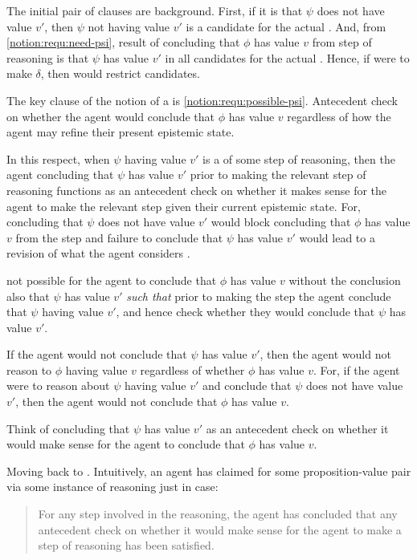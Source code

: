 \begin{note}
  The initial pair of clauses are background.
  First, if it is \epVAd{} that \(\psi\) does not have value \(v'\), then \(\psi\) not having value \(v'\) is a candidate for the actual \world{}.
  And, from \ref{notion:requ:need-psi}, result of concluding that \(\phi\) has value \(v\) from step of reasoning is that \(\psi\) has value \(v'\) in all candidates for the actual \world{}.
  Hence, if were to make \(\delta\), then would restrict candidates.

  The key clause of the notion of a \requ{} is \ref{notion:requ:possible-psi}.
  Antecedent check on whether the agent would conclude that \(\phi\) has value \(v\) regardless of how the agent may refine their present epistemic state.

  

  In this respect, when \(\psi\) having value \(v'\) is a \requ{} of some step of reasoning, then the agent concluding that \(\psi\) has value \(v'\) prior to making the relevant step of reasoning functions as an antecedent check on whether it makes sense for the agent to make the relevant step given their current epistemic state.
  For, concluding that \(\psi\) does not have value \(v'\) would block concluding that \(\phi\) has value \(v\) from the step and failure to conclude that \(\psi\) has value \(v'\) would lead to a revision of what the agent considers \epVAd{}.






  not possible for the agent to conclude that \(\phi\) has value \(v\) without the conclusion also  that \(\psi\) has value \(v'\) \emph{such that} prior to making the step the agent conclude that \(\psi\) having value \(v'\), and hence check whether they would conclude that \(\psi\) has value \(v'\).

  If the agent would not conclude that \(\psi\) has value \(v'\), then the agent would not reason to \(\phi\) having value \(v\) {\color{red} regardless of whether \(\phi\) has value \(v\)}.
  For, if the agent were to reason about \(\psi\) having value \(v'\) and conclude that \(\psi\) does not have value \(v'\), then the agent would not conclude that \(\phi\) has value \(v\).
\end{note}

\begin{note}
  Think of concluding that \(\psi\) has value \(v'\) as an antecedent check on whether it would make sense for the agent to conclude that \(\phi\) has value \(v\).

  Moving back to \ideaCS{}.
  Intuitively, an agent has claimed  for some proposition-value pair via some instance of reasoning just in case:
  \begin{quote}
    For any step involved in the reasoning, the agent has concluded that any antecedent check on whether it would make sense for the agent to make a step of reasoning has been satisfied.
  \end{quote}
\end{note}

